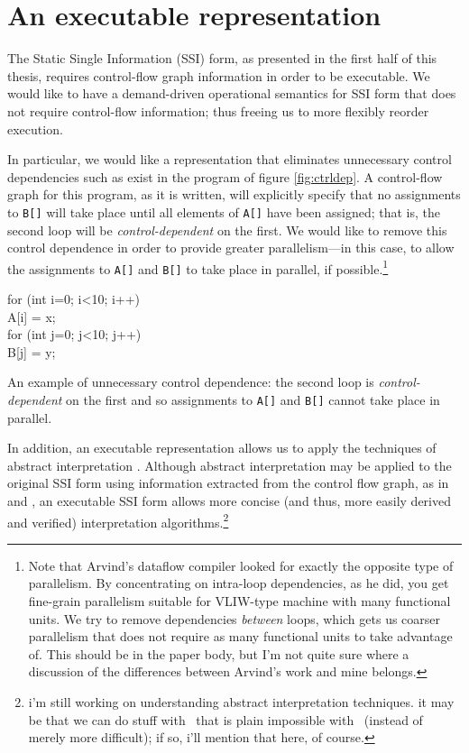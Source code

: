 \documentclass[12pt,notitlepage]{article}
\begin{document}
\section{An executable representation}\label{sec:ssiplus}
The Static Single Information (SSI) form, as presented in the first
half of this thesis,
requires control-flow graph information in order to be executable. We
would like to have a demand-driven operational semantics for SSI form
that does not require control-flow information; thus freeing us to
more flexibly reorder execution.

In particular, we would like a representation that eliminates
unnecessary control dependencies such as exist in the program of
figure \ref{fig:ctrldep}.  A control-flow graph for this program, as
it is written, will explicitly specify that no assignments to
\texttt{B[]} will take place until all elements of \texttt{A[]} have
been assigned; that is, the second loop will be
\emph{control-dependent} on the first.  We would like to remove this
control dependence in order to provide greater parallelism---in this
case, to allow the assignments to \texttt{A[]} and \texttt{B[]} to
take place in parallel, if possible.\footnote{Note that Arvind's
dataflow compiler \cite{traub86:ttda} looked for exactly the opposite type of
parallelism.  By concentrating on intra-loop dependencies, as he did, you get
fine-grain parallelism suitable for VLIW-type machine with many
functional units.  We try to remove dependencies \emph{between} loops,
which gets us coarser parallelism that does not require as many
functional units to take advantage of.  This should be in the paper
body, but I'm not quite sure where a discussion of the differences
between Arvind's work and mine belongs.}

\begin{myfigure}[t]
\begin{samplecode}
for (int i=0; i<10; i++)\\
\>A[i] = x;\\
for (int j=0; j<10; j++)\\
\>B[j] = y;\\
\end{samplecode}
\caption{An example of unnecessary control dependence: the second loop
is \emph{control-dependent} on the first and so assignments to
\texttt{A[]} and \texttt{B[]} cannot take place in parallel.}
\label{fig:ctrldep}
\end{myfigure}

In addition, an executable representation allows us to apply the
techniques of abstract interpretation \cite{idunno}.  Although abstract
interpretation may be applied to the original SSI form using
information extracted from the control flow graph, as in \cite{foo}
and \cite{bar}, an executable SSI form allows more concise (and thus,
more easily derived and verified) interpretation
algorithms.\footnote{i'm still working on understanding abstract
interpretation techniques.  it may be that we can do stuff with
\ssiplus\ that is plain impossible with \ssizero\ (instead of merely
more difficult); if so, i'll mention that here, of course.}
\end{document}
